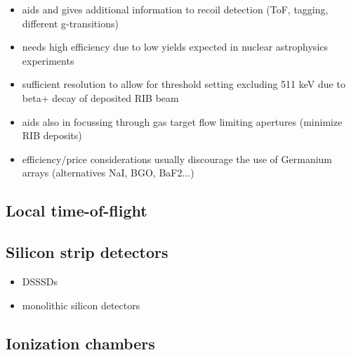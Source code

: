 \small
\begin{itemize}
\item aids and gives additional information to recoil detection (ToF, tagging, different g-transitions)
\item needs high efficiency due to low yields expected in nuclear astrophysics experiments
\item sufficient resolution to allow for threshold setting excluding 511 keV due to beta+ decay of deposited RIB beam
\item aids also in focussing through gas target flow limiting apertures (minimize RIB deposits)
\item efficiency/price considerations usually discourage the use of Germanium arrays (alternatives NaI, BGO, BaF2...)
\end{itemize}
\normalsize

\subsection{Local time-of-flight}

\cite{vock09}



\subsection{Silicon strip detectors}

\small
\begin{itemize}
\item DSSSDs
\item monolithic silicon detectors
\end{itemize}
\normalsize


\subsection{Ionization chambers}

